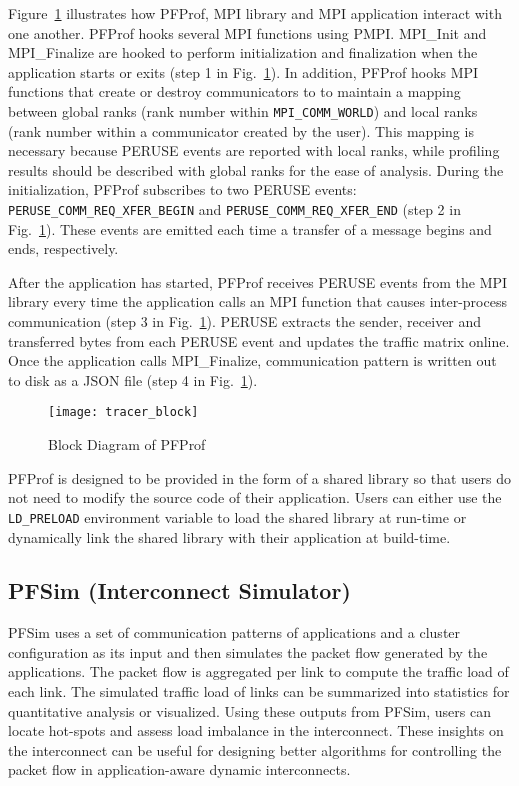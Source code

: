 Figure~\ref{fig:profiler-block} illustrates how PFProf, MPI library and
MPI application interact with one another. PFProf hooks several MPI functions
using PMPI\@. MPI\_Init and MPI\_Finalize are hooked to perform initialization
and finalization when the application starts or exits (step 1 in
Fig.~\ref{fig:profiler-block}). In addition, PFProf hooks MPI functions that
create or destroy communicators to to maintain a mapping between global ranks
(rank number within \lstinline!MPI_COMM_WORLD!) and local ranks (rank number
within a communicator created by the user). This mapping is necessary because
PERUSE events are reported with local ranks, while profiling results should be
described with global ranks for the ease of analysis. During the
initialization, PFProf subscribes to two PERUSE events:
\lstinline!PERUSE_COMM_REQ_XFER_BEGIN! and
\lstinline!PERUSE_COMM_REQ_XFER_END! (step 2 in
Fig.~\ref{fig:profiler-block}). These events are emitted each time a transfer
of a message begins and ends, respectively.

After the application has started, PFProf receives PERUSE events from the MPI
library every time the application calls an MPI function that causes
inter-process communication (step 3 in Fig.~\ref{fig:profiler-block}). PERUSE
extracts the sender, receiver and transferred bytes from each PERUSE event and
updates the traffic matrix online. Once the application calls MPI\_Finalize,
communication pattern is written out to disk as a JSON file (step 4 in
Fig.~\ref{fig:profiler-block}).

\begin{figure}
    \centering
    \texttt{[image: tracer\_block]}
    \caption{Block Diagram of PFProf}%
    \label{fig:profiler-block}
\end{figure}

PFProf is designed to be provided in the form of a shared library so that
users do not need to modify the source code of their application.
Users can either use the \lstinline!LD_PRELOAD! environment variable to load
the shared library at run-time or dynamically link the shared library with
their application at build-time.

\subsection{PFSim (Interconnect Simulator)}\label{sec:ii-pfsim}

PFSim uses a set of communication patterns of applications and a cluster
configuration as its input and then simulates the packet flow generated
by the applications. The packet flow is aggregated per link to compute
the traffic load of each link. The simulated traffic load of links can
be summarized into statistics for quantitative analysis or visualized.
Using these outputs from PFSim, users can locate hot-spots and assess
load imbalance in the interconnect. These insights on the interconnect
can be useful for designing better algorithms for controlling the packet
flow in application-aware dynamic interconnects.

